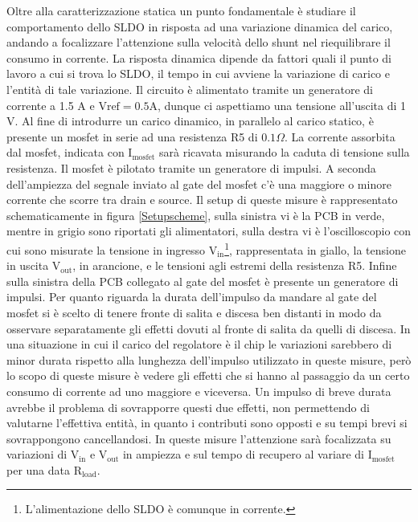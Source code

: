 Oltre alla caratterizzazione statica un punto fondamentale è studiare il comportamento dello SLDO in risposta ad una variazione dinamica del carico, andando a focalizzare l'attenzione sulla velocità dello shunt nel riequilibrare il consumo in corrente. 
La risposta dinamica dipende da fattori quali il punto di lavoro a cui si trova lo SLDO, il tempo in cui avviene la variazione di carico e l'entità di tale variazione. 
Il circuito è alimentato tramite un generatore di corrente a 1.5 A e $\mathrm{Vref=0.5 A}$, dunque ci aspettiamo una tensione all'uscita di 1 V. Al fine di introdurre un carico dinamico, in parallelo al carico statico, è presente un mosfet in serie ad una resistenza R5 di $0.1 \Omega$. 
La corrente assorbita dal mosfet, indicata con $\mathrm{I_{mosfet}}$ sarà ricavata misurando la caduta di tensione sulla resistenza. 
Il mosfet è pilotato tramite un generatore di impulsi. A seconda dell'ampiezza del segnale inviato al gate del mosfet c'è una maggiore o minore corrente che scorre tra drain e source. 
Il setup di queste misure è rappresentato schematicamente in figura \ref{Setupscheme}, sulla sinistra vi è la PCB in verde, mentre in grigio sono riportati gli alimentatori, sulla destra vi è l'oscilloscopio con cui sono misurate la tensione in ingresso $\mathrm{V_{in}}$\footnote{L'alimentazione dello SLDO è comunque in corrente.}, rappresentata in giallo, la tensione in uscita $\mathrm{V_{out}}$, in arancione, e le tensioni agli estremi della resistenza R5. Infine sulla sinistra della PCB collegato al gate del mosfet è presente un generatore di impulsi. 
Per quanto riguarda la durata dell'impulso da mandare al gate del mosfet si è scelto di tenere fronte di salita e discesa ben distanti in modo da osservare separatamente gli effetti dovuti al fronte di salita da quelli di discesa. 
In una situazione in cui il carico del regolatore è il chip le variazioni sarebbero di minor durata rispetto alla lunghezza dell'impulso utilizzato in queste misure, però lo scopo di queste misure è vedere gli effetti che si hanno al passaggio da un certo consumo di corrente ad uno maggiore e viceversa. 
Un impulso di breve durata avrebbe il problema di sovrapporre questi due effetti, non permettendo di valutarne l'effettiva entità, in quanto i contributi sono opposti e su tempi brevi si sovrappongono cancellandosi.
In queste misure l'attenzione sarà focalizzata su variazioni di $\mathrm{V_{in}}$ e $\mathrm{V_{out}}$ in ampiezza e sul tempo di recupero al variare di $\mathrm{I_{mosfet}}$ per una data $\mathrm{R_{load}}$.

